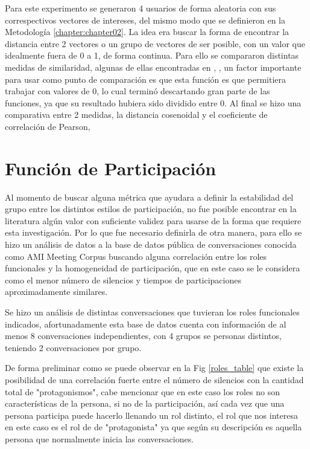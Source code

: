 Para este experimento se generaron 4 usuarios de forma aleatoria con sus correspectivos vectores de intereses, del mismo modo que se definieron en la Metodología \ref{chapter:chapter02}. La idea era buscar la forma de encontrar la distancia entre 2 vectores o un grupo de vectores de ser posible, con un valor que idealmente fuera de 0 a 1, de forma continua. Para ello se compararon distintas medidas de similaridad, algunas de ellas encontradas en \cite{SeyedShirkhorshidi2015AData}, \cite{Sung-HyukChaComprehensiveFunctions}, un factor importante para usar como punto de comparación es que esta función es que permitiera trabajar con valores de 0, lo cual terminó descartando gran parte de las funciones, ya que su resultado hubiera sido dividido entre 0. Al final se hizo una comparativa entre 2 medidas, la distancia cosenoidal y el coeficiente de correlación de Pearson, 


\section{Función de Participación}

Al momento de buscar alguna métrica que ayudara a definir la estabilidad del grupo entre los distintos estilos de participación, no fue posible encontrar en la literatura algún valor con suficiente validez para usarse de la forma que requiere esta investigación. Por lo que fue necesario definirla de otra manera, para ello se hizo un análisis de datos a la base de datos pública de conversaciones conocida como AMI Meeting Corpus buscando alguna correlación entre los roles funcionales y la homogeneidad de participación, que en este caso se le considera como el menor número de silencios y tiempos de participaciones aproximadamente similares.

Se hizo un análisis de distintas conversaciones que tuvieran los roles funcionales indicados, afortunadamente esta base de datos cuenta con información de al menos 8 conversaciones independientes, con 4 grupos se personas distintos, teniendo 2 conversaciones por grupo. 

De forma preliminar como se puede observar en la Fig \ref{roles_table} que existe la posibilidad de una correlación fuerte entre el número de silencios con la cantidad total de "protagonismos", cabe mencionar que en este caso los roles no son características de la persona, si no de la participación, así cada vez que una persona participa puede hacerlo llenando un rol distinto, el rol que nos interesa en este caso es el rol de de "protagonista" ya que según su descripción es aquella persona que normalmente inicia las conversaciones. 

